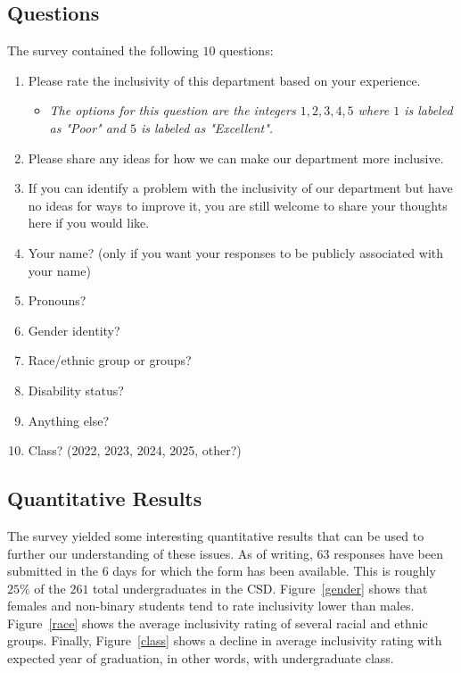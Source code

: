 \documentclass{article}
\begin{document}
\subsection{Questions}
The survey contained the following $10$ questions:
\begin{enumerate}
\item Please rate the inclusivity of this department based on your experience.	
\begin{itemize}
\item
\emph{The options for this question are the integers $1,2,3,4,5$ 
where $1$ is labeled as "Poor" and $5$ is labeled as "Excellent".}
\end{itemize}
\item Please share any ideas for how we can make our department more inclusive.	
\item If you can identify a problem with the inclusivity of our department but have no ideas for ways to improve it, you are still welcome to share your thoughts here if you would like.	
\item Your name? (only if you want your responses to be publicly associated with your name)	
\item Pronouns?	
\item Gender identity?	
\item Race/ethnic group or groups?	
\item Disability status?	
\item Anything else?	
\item Class? (2022, 2023, 2024, 2025, other?)
\end{enumerate}

\subsection{Quantitative Results}
The survey yielded some interesting quantitative results that can be 
used to further our understanding of these issues.
As of writing, $63$ responses have been submitted in the $6$ days for which the form
has been available.
This is roughly $25\%$ of the $261$ total undergraduates in the CSD.
Figure~\ref{gender} shows that females and non-binary students tend to rate inclusivity lower than males.
Figure~\ref{race} shows the average inclusivity rating of several racial 
and ethnic groups.
Finally, Figure~\ref{class} shows a decline in average inclusivity rating with 
expected year of graduation, in other words, with undergraduate class.
\end{document}
